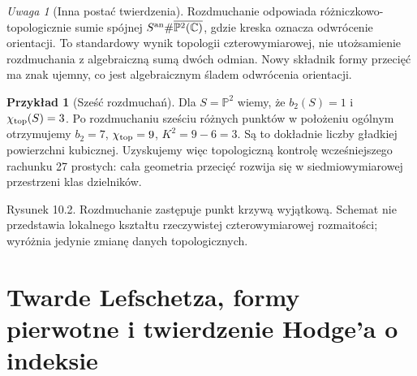 \documentclass[11pt,a4paper,openany]{report}
\numberwithin{equation}{section}
\theoremstyle{plain}
\theoremstyle{definition}
\newtheorem{przyklad}[twierdzenie]{Przykład}
\theoremstyle{remark}
\newtheorem{uwaga}[twierdzenie]{Uwaga}
\newcommand{\C}{\mathbb C}
\newcommand{\PP}{\mathbb P}
\begin{document}
\begin{uwaga}[Inna postać twierdzenia]
Rozdmuchanie odpowiada różniczkowo-topologicznie sumie
spójnej $S^{\rm an}\#\overline{\PP^2(\C)}$,
gdzie kreska oznacza odwrócenie orientacji.
To standardowy wynik topologii czterowymiarowej,
nie utożsamienie rozdmuchania z algebraiczną sumą dwóch
odmian. Nowy składnik formy przecięć ma znak ujemny,
co jest algebraicznym śladem odwrócenia orientacji.
\end{uwaga}

\begin{przyklad}[Sześć rozdmuchań]
Dla $S=\PP^2$ wiemy, że $b_2(S)=1$ i
$\chi_{\rm top}(S)=3$. Po rozdmuchaniu sześciu
różnych punktów w położeniu ogólnym otrzymujemy
$b_2=7$, $\chi_{\rm top}=9$, $K^2=9-6=3$.
Są to dokładnie liczby gładkiej powierzchni kubicznej.
Uzyskujemy więc topologiczną kontrolę wcześniejszego
rachunku 27 prostych: cała geometria przecięć rozwija się
w siedmiowymiarowej przestrzeni klas dzielników.
\end{przyklad}

\begin{center}

{\small Rysunek 10.2. Rozdmuchanie zastępuje punkt krzywą wyjątkową.
Schemat nie przedstawia lokalnego kształtu rzeczywistej czterowymiarowej
rozmaitości; wyróżnia jedynie zmianę danych topologicznych.}\par
\end{center}

\section{Twarde Lefschetza, formy pierwotne i twierdzenie Hodge'a o indeksie}
\label{sec:ga10-hard-index}
\end{document}
